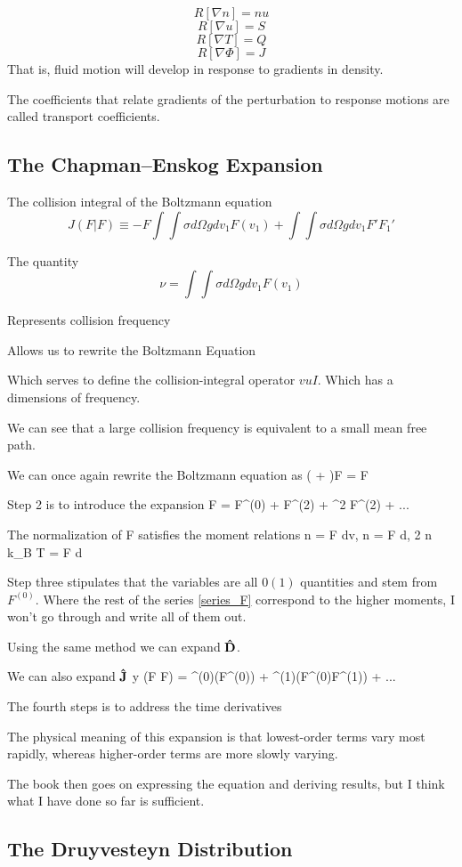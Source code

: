 \[
R[\nabla n] = nu
  \]
\[
R[\nabla u] = S
  \]
\[
R[\nabla T] = Q
  \]
\[
R[\nabla \Phi] = J
  \]
  That is, fluid motion will develop in response to gradients in density.

  The coefficients that relate gradients of the perturbation to response motions are called transport coefficients.

\subsection{The Chapman–Enskog Expansion}

The collision integral of the Boltzmann equation
\[
J(F \vert F) \equiv -F \int \int \sigma d \Omega g dv_1 F(v_1) + \int \int \sigma d \Omega g dv_1 F' F_1'
  \]

  The quantity
\[
\nu = \int \int \sigma d \Omega g dv_1 F(v_1)
  \]

  Represents collision frequency

  Allows us to rewrite the Boltzmann Equation


  Which serves to define the collision-integral operator $vu{I}$. Which has a dimensions of frequency.

  We can see that a large collision frequency is equivalent to a small mean free path.

  We can once again rewrite the Boltzmann equation as
\bq
\left( +   \right)F =  F
\label{Bolt_Chap}
\eq

Step 2 is to introduce the expansion
\bq
F = F^{(0)} + \epsilon F^{(2)} + \epsilon^2 F^{(2)} + ...
\label{series_F}
\eq

The normalization of F satisfies the moment relations
\bq
n = \int F dv, \quad n  = \int F  d, \quad {} 2 n k_B T = \int {}F d
\eq

Step three stipulates that the variables are all $0(1)$ quantities and stem from $F^{(0)}$. Where the rest of the series \eqref{series_F} correspond to the higher moments, I won't go through and write all of them out.

Using the same method we can expand $\vu{D}$.

We can also expand $\vu{J}$ y
\bq
{}(F \vert F) = ^{(0)}(F^{(0)}) + \epsilon {}^{(1)}(F^{(0)}F^{(1)}) + ...
\eq

The fourth steps is to address the time derivatives

The physical meaning of this expansion is that lowest-order terms vary most rapidly, whereas higher-order terms are more slowly varying.

The book then goes on expressing the equation and deriving results, but I think what I have done so far is sufficient.


\subsection{The Druyvesteyn Distribution}
